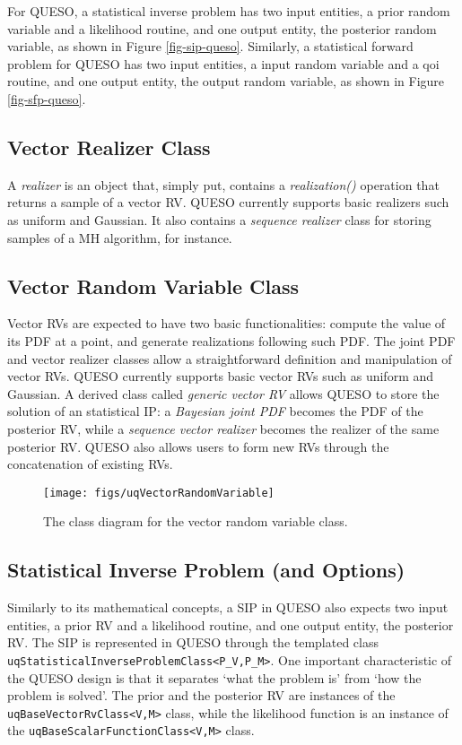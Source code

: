 For QUESO, a statistical inverse problem has two input entities, a prior random variable and
a likelihood routine, and one output entity, the posterior random variable, as shown in Figure \ref{fig-sip-queso}.
%
Similarly, a statistical forward problem for QUESO has two input entities, a input random variable and
a qoi routine, and one output entity, the output random variable, as shown in Figure \ref{fig-sfp-queso}.


\subsection{Vector Realizer Class}
%
A {\it realizer} is an object that, simply put, contains a {\it realization()} operation that returns a sample of a vector RV.
QUESO currently supports basic realizers such as uniform and Gaussian.
It also contains a {\it sequence realizer} class for storing samples of a MH algorithm, for instance.




\subsection{Vector Random Variable Class}
%
Vector RVs are expected to have two basic functionalities:
compute the value of its PDF at a point, and generate realizations following such PDF.
The joint PDF and vector realizer classes allow a straightforward definition and manipulation of vector RVs.
QUESO currently supports basic vector RVs such as uniform and Gaussian.
A derived class called {\it generic vector RV} allows QUESO to store the solution of an statistical IP:
a {\it Bayesian joint PDF} becomes the PDF of the posterior RV, while a {\it sequence vector realizer} becomes the realizer of the same posterior RV.
QUESO also allows users to form new RVs through the concatenation of existing RVs.


\begin{figure}[htpb]
\centering
\texttt{[image: figs/uqVectorRandomVariable]}
\vspace{-8pt}
\caption{The class diagram for the vector random variable class.}
\label{fig-vector-rv-class}
\end{figure}



\subsection{Statistical Inverse Problem (and Options)}
Similarly to its mathematical concepts, a SIP in QUESO also expects two input entities, a prior RV and a likelihood routine, and one output entity, the posterior RV.
The SIP is represented in QUESO through the templated class \verb+uqStatisticalInverseProblemClass<P_V,P_M>+.
One important characteristic of the QUESO design is that it  separates `what the problem is' from `how the problem is solved'.
The prior and the posterior RV are instances of the \verb+uqBaseVectorRvClass<V,M>+ class, while
the likelihood function is an instance of the \verb+uqBaseScalarFunctionClass<V,M>+ class.

